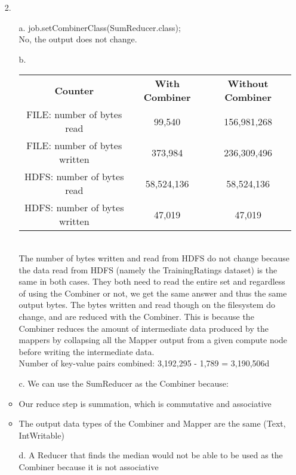\documentclass{article}
\begin{document}
\begin{itemize}
\pagebreak
\item[2.]
	\begin{itemize}
		\item[a.] job.setCombinerClass(SumReducer.class);\\
			No, the output does not change.
		\item[b.] 
			\begin{tabular}{|c||c|c|}
				\hline 
				\textbf{Counter} & \textbf{With Combiner} & \textbf{Without Combiner}\\
				FILE: number of bytes read & 99,540 & 156,981,268\\
				FILE: number of bytes written & 373,984 & 236,309,496\\
				HDFS: number of bytes read & 58,524,136 & 58,524,136\\
				HDFS: number of bytes written & 47,019 & 47,019\\
				\hline
			\end{tabular}
		\\		
		The number of bytes written and read from HDFS do not change because the data read from HDFS (namely the TrainingRatings dataset) is the same in both cases. They both need to read the entire set and regardless of using the Combiner or not, we get the same answer and thus the same output bytes. The bytes written and read though on the filesystem do change, and are reduced with the Combiner. This is because the Combiner reduces the amount of intermediate data produced by the mappers by collapsing all the Mapper output from a given compute node before writing the intermediate data.\\
		Number of key-value pairs combined: 3,192,295 - 1,789 = 3,190,506d		
		\item[c.] We can use the SumReducer as the Combiner because:
			\item Our reduce step is summation, which is commutative and associative
			\item The output data types of the Combiner and Mapper are the same (Text, IntWritable)
		\item[d.] A Reducer that finds the median would not be able to be used as the Combiner because it is not associative
	
	\end{itemize}

	
\end{itemize}
\end{document}
